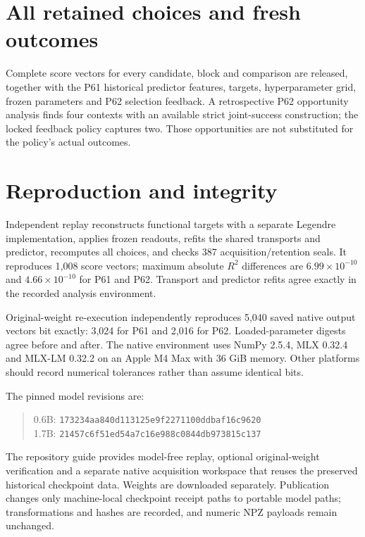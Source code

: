 \documentclass[11pt]{article}
\begin{document}
\appendix
\section{All retained choices and fresh outcomes}
\begin{table}[ht]\centering\small
\caption{All twelve P62 retained choices. Action is source return-action fraction; $\Delta$ is fresh nonlinear temporal score change. The zero-reference row is retained and cannot be a joint success.}\label{tab:cases}
\end{table}
Complete score vectors for every candidate, block and comparison are released, together with the P61 historical predictor features, targets, hyperparameter grid, frozen parameters and P62 selection feedback. A retrospective P62 opportunity analysis finds four contexts with an available strict joint-success construction; the locked feedback policy captures two. Those opportunities are not substituted for the policy's actual outcomes.

\section{Reproduction and integrity}
Independent replay reconstructs functional targets with a separate Legendre implementation, applies frozen readouts, refits the shared transports and predictor, recomputes all choices, and checks 387 acquisition/retention seals. It reproduces 1,008 score vectors; maximum absolute $R^2$ differences are $6.99\times10^{-10}$ and $4.66\times10^{-10}$ for P61 and P62. Transport and predictor refits agree exactly in the recorded analysis environment.

\begin{samepage}
Original-weight re-execution independently reproduces 5,040 saved native output vectors bit exactly: 3,024 for P61 and 2,016 for P62. Loaded-parameter digests agree before and after. The native environment uses NumPy 2.5.4, MLX 0.32.4 and MLX-LM 0.32.2 on an Apple M4 Max with 36 GiB memory. Other platforms should record numerical tolerances rather than assume identical bits.
\end{samepage}

The pinned model revisions are:
\begin{quote}\small
0.6B: \texttt{173234aa840d113125e9f2271100ddbaf16c9620}\\
1.7B: \texttt{21457c6f51ed54a7c16e988c0844db973815c137}
\end{quote} The repository guide provides model-free replay, optional original-weight verification and a separate native acquisition workspace that reuses the preserved historical checkpoint data. Weights are downloaded separately. Publication changes only machine-local checkpoint receipt paths to portable model paths; transformations and hashes are recorded, and numeric NPZ payloads remain unchanged.
\end{document}
